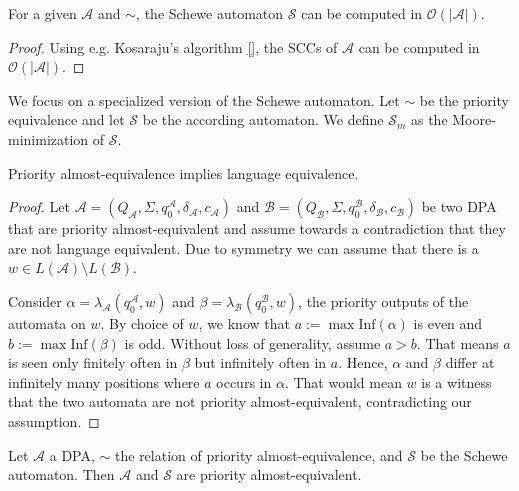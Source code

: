 \begin{lem}
	For a given $\mathcal{A}$ and $\sim$, the Schewe automaton $\mathcal{S}$ can be computed in $\mathcal{O}(|\mathcal{A}|)$.
\end{lem}

\begin{proof}
	Using e.g. Kosaraju's algorithm \ref{}, the SCCs of $\mathcal{A}$ can be computed in $\mathcal{O}(|\mathcal{A}|)$. %
\end{proof}

We focus on a specialized version of the Schewe automaton. Let $\sim$ be the priority equivalence and let $\mathcal{S}$ be the according automaton. We define $\mathcal{S}_m$ as the Moore-minimization of $\mathcal{S}$.

\begin{lem}
	Priority almost-equivalence implies language equivalence.
\end{lem}

\begin{proof}
	Let $\mathcal{A} = (Q_\mathcal{A}, \Sigma, q_0^\mathcal{A}, \delta_\mathcal{A}, c_\mathcal{A})$ and $\mathcal{B} = (Q_\mathcal{B}, \Sigma, q_0^\mathcal{B}, \delta_\mathcal{B}, c_\mathcal{B})$ be two DPA that are priority almost-equivalent and assume towards a contradiction that they are not language equivalent. Due to symmetry we can assume that there is a $w \in L(\mathcal{A}) \setminus L(\mathcal{B})$. 
	
	Consider $\alpha = \lambda_\mathcal{A}(q_0^\mathcal{A}, w)$ and $\beta = \lambda_\mathcal{B}(q_0^\mathcal{B}, w)$, the priority outputs of the automata on $w$. By choice of $w$, we know that $a := \max \text{Inf}(\alpha)$ is even and $b := \max \text{Inf}(\beta)$ is odd. Without loss of generality, assume $a > b$. That means $a$ is seen only finitely often in $\beta$ but infinitely often in $a$. Hence, $\alpha$ and $\beta$ differ at infinitely many positions where $a$ occurs in $\alpha$. That would mean $w$ is a witness that the two automata are not priority almost-equivalent, contradicting our assumption.
\end{proof}

\begin{lem}
	Let $\mathcal{A}$ a DPA, $\sim$ the relation of priority almost-equivalence, and $\mathcal{S}$ be the Schewe automaton. Then $\mathcal{A}$ and $\mathcal{S}$ are priority almost-equivalent.
\end{lem}


